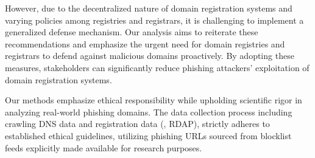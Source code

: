 However, due to the decentralized nature of domain registration systems and varying policies among registries and registrars, it is challenging to implement a generalized defense mechanism. Our analysis aims to reiterate these recommendations and emphasize the urgent need for domain registries and registrars to defend against malicious domains proactively. 
By adopting these measures, stakeholders can significantly reduce phishing attackers' exploitation of domain registration systems.

Our methods emphasize ethical responsibility while upholding scientific rigor in analyzing real-world phishing domains. 
The data collection process including crawling DNS data and registration data (\eg, RDAP), strictly adheres to established ethical guidelines, utilizing phishing URLs sourced from blocklist feeds explicitly made available for research purposes.
\vspace{-10px}
